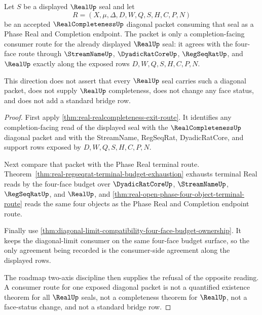 \begin{theorem}
\label{thm:real-realcompleteness-consumer-direction}
Let $S$ be a displayed $\RealUp$ seal and let
$$
R=(X,\mu,\Delta,D,W,Q,S,H,C,P,N)
$$
be an accepted $\RealCompletenessUp$ diagonal packet consuming that seal as a Phase Real and Completion endpoint. The packet is only a completion-facing consumer route for the already displayed $\RealUp$ seal: it agrees with the four-face route through $\StreamNameUp$, $\DyadicRatCoreUp$, $\RegSeqRatUp$, and $\RealUp$ exactly along the exposed rows $D,W,Q,S,H,C,P,N$.

This direction does not assert that every $\RealUp$ seal carries such a diagonal packet, does not supply $\RealUp$ completeness, does not change any face status, and does not add a standard bridge row.
\end{theorem}
\begin{proof}
First apply \autoref{thm:real-realcompleteness-exit-route}. It identifies any completion-facing read of the displayed seal with the $\RealCompletenessUp$ diagonal packet and with the StreamName, RegSeqRat, DyadicRatCore, and support rows exposed by $D,W,Q,S,H,C,P,N$.

Next compare that packet with the Phase Real terminal route. Theorem~\ref{thm:real-regseqrat-terminal-budget-exhaustion} exhausts terminal Real reads by the four-face budget over $\DyadicRatCoreUp$, $\StreamNameUp$, $\RegSeqRatUp$, and $\RealUp$, and \autoref{thm:real-open-phase-four-object-terminal-route} reads the same four objects as the Phase Real and Completion endpoint route.

Finally use \autoref{thm:diagonal-limit-compatibility-four-face-budget-ownership}. It keeps the diagonal-limit consumer on the same four-face budget surface, so the only agreement being recorded is the consumer-side agreement along the displayed rows.

The roadmap two-axis discipline then supplies the refusal of the opposite reading. A consumer route for one exposed diagonal packet is not a quantified existence theorem for all $\RealUp$ seals, not a completeness theorem for $\RealUp$, not a face-status change, and not a standard bridge row.
\end{proof}

